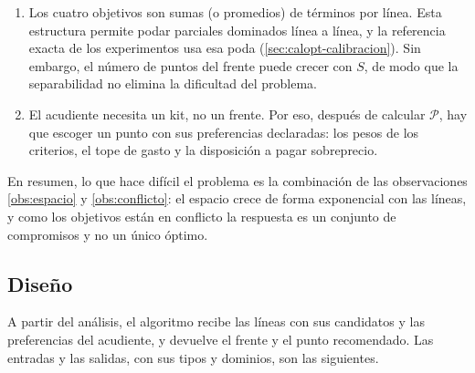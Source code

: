 \begin{enumerate}[label=\textbf{O\arabic*.}, ref=O\arabic*]
  \item\label{obs:separable} Los cuatro objetivos son sumas (o promedios) de
  términos por línea. Esta estructura permite podar parciales dominados línea
  a línea, y la referencia exacta de los experimentos usa esa poda
  (\cref{sec:calopt-calibracion}). Sin embargo, el número de puntos del frente
  puede crecer con $S$, de modo que la separabilidad no elimina la dificultad
  del problema.

  \item\label{obs:decision} El acudiente necesita un kit, no un frente. Por eso,
  después de calcular $\mathcal{P}$, hay que escoger un punto con sus
  preferencias declaradas: los pesos de los criterios, el tope de gasto y la
  disposición a pagar sobreprecio.
\end{enumerate}

En resumen, lo que hace difícil el problema es la combinación de las
observaciones \ref{obs:espacio} y \ref{obs:conflicto}: el espacio crece de
forma exponencial con las líneas, y como los objetivos están en conflicto la
respuesta es un conjunto de compromisos y no un único óptimo.

\subsection{Diseño}
\label{sec:calopt-diseno}

A partir del análisis, el algoritmo recibe las líneas con sus candidatos y las
preferencias del acudiente, y devuelve el frente y el punto recomendado. Las
entradas y las salidas, con sus tipos y dominios, son las siguientes.

